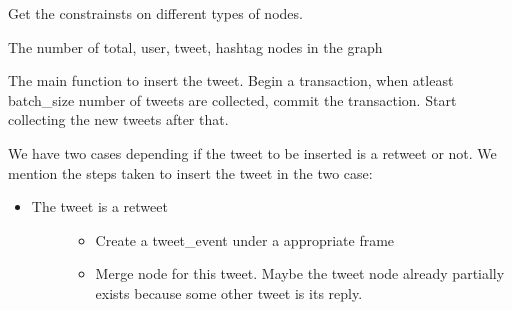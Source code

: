 \documentclass[letterpaper,10pt,english]{sphinxmanual}
\begin{document}
\begin{fulllineitems}
\begin{fulllineitems}
\begin{quote}
\begin{description}
\end{description}\end{quote}

\end{fulllineitems}


\begin{fulllineitems}
\label{\detokenize{neo4j_data_ingestion:ingest_neo4j_streaming.Twitter.get_constraints}}
Get the constrainsts on different types of nodes.

\end{fulllineitems}


\begin{fulllineitems}
\label{\detokenize{neo4j_data_ingestion:ingest_neo4j_streaming.Twitter.get_profile}}
The number of total, user, tweet, hashtag nodes in the graph

\end{fulllineitems}


\begin{fulllineitems}
\label{\detokenize{neo4j_data_ingestion:ingest_neo4j_streaming.Twitter.insert_tweet}}
The main function to insert the tweet. Begin a transaction, when atleast batch\_size number of tweets
are collected, commit the transaction. Start collecting the new tweets after that.

We have two cases depending if the tweet to be inserted is a
retweet or not. We mention the steps taken to insert the tweet in the two case:
\begin{itemize}
\item {} \begin{description}
\item[{The tweet is a retweet}] \leavevmode\begin{itemize}
\item {} 
Create a tweet\_event under a appropriate frame

\item {} 
Merge node for this tweet. Maybe the tweet node already partially exists because some other tweet is its reply.


\end{itemize}
\end{description}
\end{itemize}
\end{fulllineitems}
\end{fulllineitems}
\end{document}
